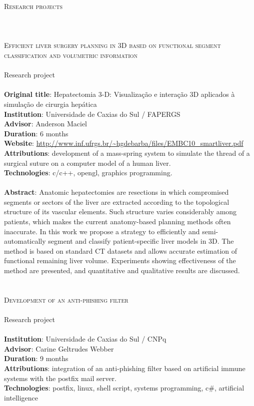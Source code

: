\noindent \textsc{\Huge Research projects}
\\\\\\\\
\noindent \textsc{
    \Large Efficient liver surgery planning in 3D based on functional segment
    classification and volumetric information}
\\\\
Research project
\\\\
\textbf{Original title}:
    Hepatectomia 3-D: Visualização e interação 3D aplicados à simulação
    de cirurgia hepática \\
\textbf{Institution}: Universidade de Caxias do Sul / FAPERGS \\
\textbf{Advisor}: Anderson Maciel \\
\textbf{Duration}: 6 months \\
\textbf{Website}:
    \url{http://www.inf.ufrgs.br/~hgdebarba/files/EMBC10_smartliver.pdf} \\
\textbf{Attributions}:
    development of a mass-spring system to simulate the thread of a surgical
    suture on a computer model of a human liver.  \\
\textbf{Technologies}: c/c++, opengl, graphics programming.
\\\\
\textbf{Abstract}:
    Anatomic hepatectomies are resections in which compromised segments or
    sectors of the liver are extracted according to the topological structure
    of its vascular elements. Such structure varies considerably among
    patients, which makes the current anatomy-based planning methods often
    inaccurate. In this work we propose a strategy to efficiently and
    semi-automatically segment and classify patient-specific liver models in
    3D. The method is based on standard CT datasets and allows accurate
    estimation of functional remaining liver volume. Experiments showing
    effectiveness of the method are presented, and quantitative and qualitative
    results are discussed.
\\\\\\
\noindent \textsc{\Large Development of an anti-phishing filter}
\\\\
Research project
\\\\
\textbf{Institution}: Universidade de Caxias do Sul / CNPq \\
\textbf{Advisor}: Carine Geltrudes Webber \\
\textbf{Duration}: 9 months \\
\textbf{Attributions}:
    integration of an anti-phishing filter based on artificial immune systems
    with the postfix mail server. \\
\textbf{Technologies}:
    postfix, linux, shell script, systems programming, c\#, artificial
    intelligence
